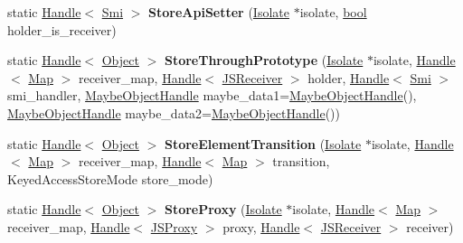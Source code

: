 \begin{DoxyCompactItemize}
static \mbox{\hyperlink{classv8_1_1internal_1_1Handle}{Handle}}$<$ \mbox{\hyperlink{classv8_1_1internal_1_1Smi}{Smi}} $>$ {\bfseries Store\+Api\+Setter} (\mbox{\hyperlink{classv8_1_1internal_1_1Isolate}{Isolate}} $\ast$isolate, \mbox{\hyperlink{classbool}{bool}} holder\+\_\+is\+\_\+receiver)
\item 
\mbox{\label{classv8_1_1internal_1_1StoreHandler_a82579af6eb8277c9fe4c5ab56826f281}} 
static \mbox{\hyperlink{classv8_1_1internal_1_1Handle}{Handle}}$<$ \mbox{\hyperlink{classv8_1_1internal_1_1Object}{Object}} $>$ {\bfseries Store\+Through\+Prototype} (\mbox{\hyperlink{classv8_1_1internal_1_1Isolate}{Isolate}} $\ast$isolate, \mbox{\hyperlink{classv8_1_1internal_1_1Handle}{Handle}}$<$ \mbox{\hyperlink{classv8_1_1internal_1_1Map}{Map}} $>$ receiver\+\_\+map, \mbox{\hyperlink{classv8_1_1internal_1_1Handle}{Handle}}$<$ \mbox{\hyperlink{classv8_1_1internal_1_1JSReceiver}{J\+S\+Receiver}} $>$ holder, \mbox{\hyperlink{classv8_1_1internal_1_1Handle}{Handle}}$<$ \mbox{\hyperlink{classv8_1_1internal_1_1Smi}{Smi}} $>$ smi\+\_\+handler, \mbox{\hyperlink{classv8_1_1internal_1_1MaybeObjectHandle}{Maybe\+Object\+Handle}} maybe\+\_\+data1=\mbox{\hyperlink{classv8_1_1internal_1_1MaybeObjectHandle}{Maybe\+Object\+Handle}}(), \mbox{\hyperlink{classv8_1_1internal_1_1MaybeObjectHandle}{Maybe\+Object\+Handle}} maybe\+\_\+data2=\mbox{\hyperlink{classv8_1_1internal_1_1MaybeObjectHandle}{Maybe\+Object\+Handle}}())
\item 
\mbox{\label{classv8_1_1internal_1_1StoreHandler_aca94cbb293d9a65273b8bc246a93248a}} 
static \mbox{\hyperlink{classv8_1_1internal_1_1Handle}{Handle}}$<$ \mbox{\hyperlink{classv8_1_1internal_1_1Object}{Object}} $>$ {\bfseries Store\+Element\+Transition} (\mbox{\hyperlink{classv8_1_1internal_1_1Isolate}{Isolate}} $\ast$isolate, \mbox{\hyperlink{classv8_1_1internal_1_1Handle}{Handle}}$<$ \mbox{\hyperlink{classv8_1_1internal_1_1Map}{Map}} $>$ receiver\+\_\+map, \mbox{\hyperlink{classv8_1_1internal_1_1Handle}{Handle}}$<$ \mbox{\hyperlink{classv8_1_1internal_1_1Map}{Map}} $>$ transition, Keyed\+Access\+Store\+Mode store\+\_\+mode)
\item 
\mbox{\label{classv8_1_1internal_1_1StoreHandler_a85b447f0d895996e6456b86386cfb8ff}} 
static \mbox{\hyperlink{classv8_1_1internal_1_1Handle}{Handle}}$<$ \mbox{\hyperlink{classv8_1_1internal_1_1Object}{Object}} $>$ {\bfseries Store\+Proxy} (\mbox{\hyperlink{classv8_1_1internal_1_1Isolate}{Isolate}} $\ast$isolate, \mbox{\hyperlink{classv8_1_1internal_1_1Handle}{Handle}}$<$ \mbox{\hyperlink{classv8_1_1internal_1_1Map}{Map}} $>$ receiver\+\_\+map, \mbox{\hyperlink{classv8_1_1internal_1_1Handle}{Handle}}$<$ \mbox{\hyperlink{classv8_1_1internal_1_1JSProxy}{J\+S\+Proxy}} $>$ proxy, \mbox{\hyperlink{classv8_1_1internal_1_1Handle}{Handle}}$<$ \mbox{\hyperlink{classv8_1_1internal_1_1JSReceiver}{J\+S\+Receiver}} $>$ receiver)

\end{DoxyCompactItemize}
